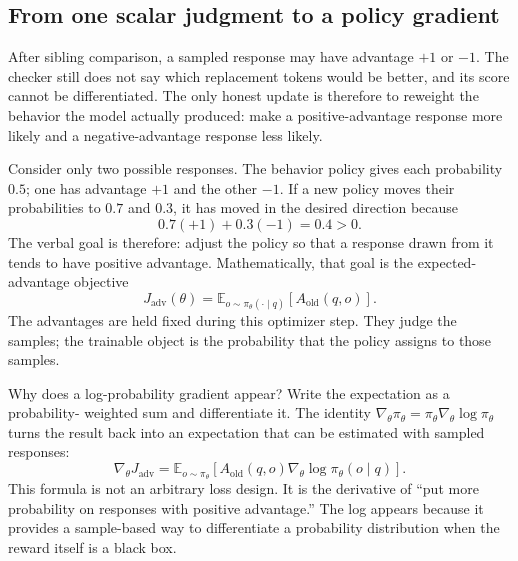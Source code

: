 \subsection{From one scalar judgment to a policy gradient}
\label{subsec:grpo-gradient-direction}

After sibling comparison, a sampled response may have advantage $+1$ or $-1$. The checker
still does not say which replacement tokens would be better, and its score cannot be
differentiated. The only honest update is therefore to reweight the behavior the model
actually produced: make a positive-advantage response more likely and a
negative-advantage response less likely.

Consider only two possible responses. The behavior policy gives each probability $0.5$;
one has advantage $+1$ and the other $-1$. If a new policy moves their probabilities to
$0.7$ and $0.3$, it has moved in the desired direction because
\begin{equation}
  0.7(+1)+0.3(-1)=0.4>0.
  \label{eq:grpo-parent-objective-example}
\end{equation}
The verbal goal is therefore: adjust the policy so that a response drawn from it tends to
have positive advantage. Mathematically, that goal is the expected-advantage objective
\begin{equation}
  J_{\mathrm{adv}}(\theta)
  =\mathbb{E}_{o\sim\pi_\theta(\cdot\mid q)}
    \left[A_{\mathrm{old}}(q,o)\right].
  \label{eq:grpo-parent-expected-advantage}
\end{equation}
The advantages are held fixed during this optimizer step. They judge the samples; the
trainable object is the probability that the policy assigns to those samples.

Why does a log-probability gradient appear? Write the expectation as a probability-
weighted sum and differentiate it. The identity
$\nabla_\theta\pi_\theta=\pi_\theta\nabla_\theta\log\pi_\theta$ turns the result back into
an expectation that can be estimated with sampled responses:
\begin{equation}
  \nabla_\theta J_{\mathrm{adv}}
  =\mathbb{E}_{o\sim\pi_\theta}
    \left[A_{\mathrm{old}}(q,o)\nabla_\theta\log\pi_\theta(o\mid q)\right].
  \label{eq:grpo-parent-policy-gradient}
\end{equation}
This formula is not an arbitrary loss design. It is the derivative of ``put more
probability on responses with positive advantage.'' The log appears because it provides a
sample-based way to differentiate a probability distribution when the reward itself is a
black box.

